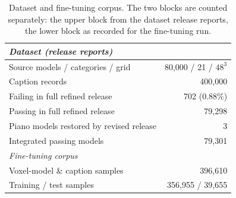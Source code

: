 \begin{table}[t]
\centering
\small
\setlength{\tabcolsep}{4pt}
\begin{tabular}{lr}
\toprule
\multicolumn{2}{l}{\emph{Dataset (release reports)}} \\
\midrule
Source models / categories / grid & 80,000 / 21 / $48^3$ \\
Caption records & 400,000 \\
Failing in full refined release & 702 (0.88\%) \\
Passing in full refined release & 79,298 \\
Piano models restored by revised release & 3 \\
Integrated passing models & 79,301 \\
\midrule
\multicolumn{2}{l}{\emph{Fine-tuning corpus}} \\
\midrule
Voxel-model \& caption samples & 396,610 \\ %
Training / %
test samples & 356,955 / 39,655 \\
\bottomrule
\end{tabular}
\caption{Dataset and fine-tuning corpus. The two blocks are counted separately: the upper block from the dataset release reports, the lower block as recorded for the fine-tuning run.}
\label{tab:training-data}
\end{table}
